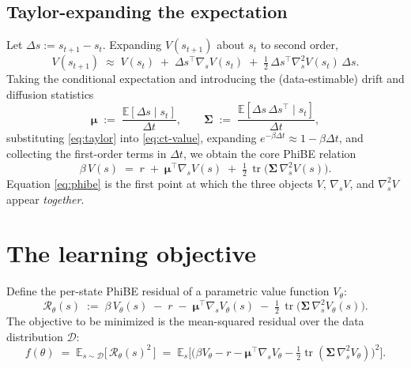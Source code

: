\documentclass[11pt]{article}
\newcommand{\E}{\mathbb{E}}
\newcommand{\grads}{\nabla_s}
\newcommand{\hess}{\nabla_s^2}
\newcommand{\tr}{\operatorname{tr}}
\newcommand{\Res}{\mathcal{R}}
\newcommand{\D}{\mathcal{D}}
\begin{document}
\subsection{Taylor-expanding the expectation}
Let $\Delta s := s_{t+1} - s_t$. Expanding $V(s_{t+1})$ about $s_t$ to
second order,
\begin{equation}
\label{eq:taylor}
V(s_{t+1}) \;\approx\; V(s_t)
\;+\; \Delta s^\top \grads V(s_t)
\;+\; \tfrac12\, \Delta s^\top \hess V(s_t)\, \Delta s .
\end{equation}
Taking the conditional expectation and introducing the (data-estimable)
drift and diffusion statistics
\begin{equation}
\label{eq:mu-sigma}
\bm{\mu} \;:=\; \frac{\E[\Delta s \mid s_t]}{\Delta t},
\qquad
\bm{\Sigma} \;:=\; \frac{\E[\Delta s\, \Delta s^\top \mid s_t]}{\Delta t},
\end{equation}
substituting \eqref{eq:taylor} into \eqref{eq:ct-value}, expanding
$e^{-\beta\Delta t} \approx 1 - \beta\Delta t$, and collecting the
first-order terms in $\Delta t$, we obtain the core PhiBE relation
\begin{equation}
\label{eq:phibe}
\boxed{\;
\beta\, V(s) \;=\; r
\;+\; \bm{\mu}^\top \grads V(s)
\;+\; \tfrac12\,\tr\!\big(\bm{\Sigma}\, \hess V(s)\big).
\;}
\end{equation}
Equation \eqref{eq:phibe} is the first point at which the three objects
$V$, $\grads V$, and $\hess V$ appear \emph{together}.

\section{The learning objective}

Define the per-state PhiBE residual of a parametric value function
$V_\theta$:
\begin{equation}
\label{eq:residual}
\Res_\theta(s) \;:=\;
\beta\, V_\theta(s) \;-\; r
\;-\; \bm{\mu}^\top \grads V_\theta(s)
\;-\; \tfrac12\,\tr\!\big(\bm{\Sigma}\, \hess V_\theta(s)\big).
\end{equation}
The objective to be minimized is the mean-squared residual over the data
distribution $\D$:
\begin{equation}
\label{eq:objective}
\boxed{\;
f(\theta) \;=\; \E_{s\sim\D}\!\Big[\, \Res_\theta(s)^2 \,\Big]
\;=\; \E_{s}\!\Big[\big(\beta V_\theta - r
- \bm{\mu}^\top \grads V_\theta
- \tfrac12 \tr(\bm{\Sigma}\, \hess V_\theta)\big)^2\Big].
\;}
\end{equation}
\end{document}
